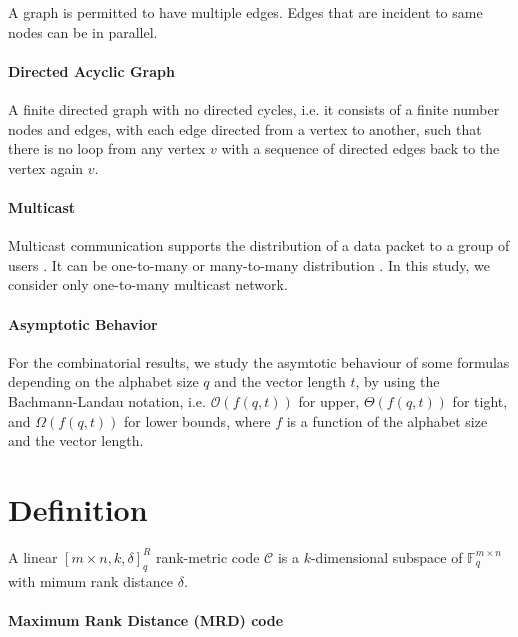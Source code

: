 A graph is permitted to have multiple edges. Edges that are incident
to same nodes can be in parallel. 

\paragraph{Directed Acyclic Graph}

A finite directed graph with no directed cycles, i.e. it consists
of a finite number nodes and edges, with each edge directed from a
vertex to another, such that there is no loop from any vertex $v$
with a sequence of directed edges back to the vertex again $v$.

\paragraph{Multicast}

Multicast communication supports the distribution of a data packet
to a group of users \cite{Zhang:2012}. It can be one-to-many or many-to-many
distribution \cite{Harte:2008}. In this study, we consider only one-to-many
multicast network.

\paragraph{Asymptotic Behavior}

For the combinatorial results, we study the asymtotic behaviour of
some formulas depending on the alphabet size $q$ and the vector length
$t$, by using the Bachmann-Landau notation, i.e. $\mathcal{O}\left(f\left(q,t\right)\right)$
for upper, $\Theta\left(f\left(q,t\right)\right)$ for tight, and
$\Omega\left(f\left(q,t\right)\right)$ for lower bounds, where $f$
is a function of the alphabet size and the vector length.

\section{Definition}
\begin{defn}
 A linear $\left[m\times n,k,\delta\right]_{q}^{R}$ rank-metric
code $\mathcal{C}$ is a $k$-dimensional subspace of $\ensuremath{\mathbb{F}}_{q}^{m\times n}$
with mimum rank distance $\delta$.
\end{defn}

\paragraph{Maximum Rank Distance (MRD) code}

